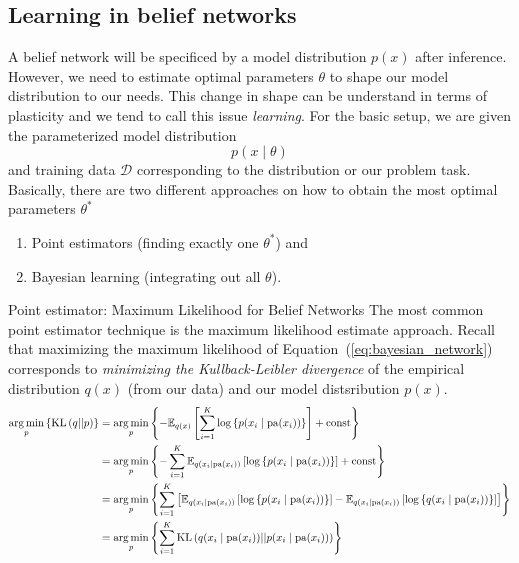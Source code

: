 \subsection{Learning in belief networks}
A belief network will be specificed by a model distribution \ensuremath{p(x)} after inference. %
However, we need to estimate optimal parameters \ensuremath{\theta} to shape our model distribution to our needs. %
This change in shape can be understand in terms of plasticity and we tend to call this issue \emph{learning}. %
For the basic setup, we are given the parameterized model distribution %
\begin{equation}
p(x\mid\theta)
\end{equation}
and training data \ensuremath{\mathcal{D}} corresponding to the distribution or our problem task. %
Basically, there are two different approaches on how to obtain the most optimal parameters \ensuremath{\theta^*} %
\begin{enumerate}
	\item Point estimators (finding exactly one \ensuremath{\theta^*}) and
	\item Bayesian learning (integrating out all \ensuremath{\theta}). %
\end{enumerate}
%
%
%
\begin{topic}{.3cm}{Point estimator: Maximum Likelihood for Belief Networks}
	The most common point estimator technique is the maximum likelihood estimate approach. %
	Recall that maximizing the maximum likelihood of Equation~(\ref{eq:bayesian_network}) corresponds to \emph{minimizing the Kullback-Leibler divergence} of the empirical distribution \ensuremath{q(x)} (from our data) and our model distsribution \ensuremath{p(x)}. %
	\begin{equation}
	\begin{aligned}
	\underset{p}{\arg\min}\left\{ \KL{q}{p} \right\} %
	&= \underset{p}{\arg\min}\left\{  -\E[q(x)]{ \sum_{i=1}^{K} \log\left\{ p(x_i\mid\PA(x_i)) \right\} } + \text{const}  \right\}\\ %
	&= \underset{p}{\arg\min}\left\{  -\sum_{i=1}^{K} \E[q(x_i\mid\PA(x_i))]{ \log\left\{ p(x_i\mid\PA(x_i)) \right\} } + \text{const}  \right\}\\ %
	&= \underset{p}{\arg\min}\left\{  \sum_{i=1}^{K} \left[  \E[q(x_i\mid\PA(x_i))]{ \log\left\{ p(x_i\mid\PA(x_i)) \right\} } - \E[q(x_i\mid\PA(x_i))]{ \log\left\{ q(x_i\mid\PA(x_i)) \right\} }  \right]  \right\}\\ %
	&= \underset{p}{\arg\min}\left\{  \sum_{i=1}^{K} \KL{q(x_i\mid\PA(x_i))}{p(x_i\mid\PA(x_i))}  \right\}\\ %
	\end{aligned}
	\end{equation}
\end{topic}
